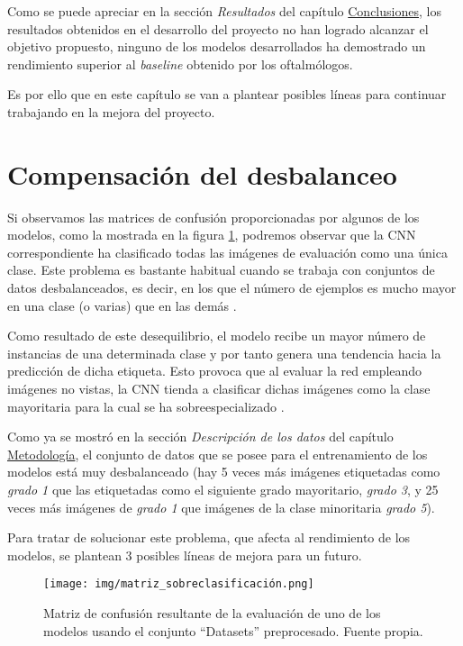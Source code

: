  \label{Fut}

Como se puede apreciar en la sección \textit{Resultados} del capítulo \hyperref[Conc]{Conclusiones}, los resultados obtenidos en el desarrollo del proyecto no han logrado alcanzar el objetivo propuesto, ninguno de los modelos desarrollados ha demostrado un rendimiento superior al \textit{baseline} obtenido por los oftalmólogos.

Es por ello que en este capítulo se van a plantear posibles líneas para continuar trabajando en la mejora del proyecto.

\section{Compensación del desbalanceo}

Si observamos las matrices de confusión proporcionadas por algunos de los modelos, como la mostrada en la figura \ref{fig:matriz}, podremos observar que la CNN correspondiente ha clasificado todas las imágenes de evaluación como una única clase. Este problema es bastante habitual cuando se trabaja con conjuntos de datos desbalanceados, es decir, en los que el número de ejemplos es mucho mayor en una clase (o varias) que en las demás \cite{fut:desbalanceados}. 

Como resultado de este desequilibrio, el modelo recibe un mayor número de instancias de una determinada clase y por tanto genera una tendencia hacia la predicción de dicha etiqueta. Esto provoca que al evaluar la red empleando imágenes no vistas, la CNN tienda a clasificar dichas imágenes como la clase mayoritaria para la cual se ha sobreespecializado \cite{fut:desbalanceados_2}. 

Como ya se mostró en la sección \textit{Descripción de los datos} del capítulo \hyperref[Met]{Metodología}, el conjunto de datos que se posee para el entrenamiento de los modelos está muy desbalanceado (hay 5 veces más imágenes etiquetadas como \textit{grado 1} que las etiquetadas como el siguiente grado mayoritario, \textit{grado 3}, y 25 veces más imágenes de \textit{grado 1} que imágenes de la clase minoritaria \textit{grado 5}).

Para tratar de solucionar este problema, que afecta al rendimiento de los modelos, se plantean 3 posibles líneas de mejora para un futuro.

\begin{figure}[h]
    \centering
    \texttt{[image: img/matriz\_sobreclasificación.png]}
    \caption{Matriz de confusión resultante de la evaluación de uno de los modelos usando el conjunto ``Datasets'' preprocesado. Fuente propia.}
    \label{fig:matriz}
\end{figure}


